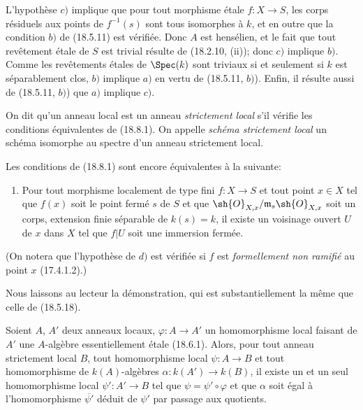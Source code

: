 L'hypothèse $c)$ implique que pour tout morphisme étale $f:X\to S$, les corps résiduels aux points de $f^{-1}(s)$ sont tous isomorphes à $k$, et en outre que la condition $b)$ de (18.5.11) est vérifiée. Donc $A$ est hensélien, et le fait que tout revêtement étale de $S$ est trivial résulte de (18.2.10, (ii)); donc $c)$ implique $b)$. Comme les revêtements étales de $\Spec(k)$ sont triviaux si et seulement si $k$ est séparablement clos, $b)$ implique $a)$ en vertu de (18.5.11, $b)$). Enfin, il résulte aussi de (18.5.11, $b)$) que $a)$ implique $c)$.

\begin{definition}[18.8.2]
\label{IV.18.8.2}
On dit qu'un anneau local est un anneau \emph{strictement local} s'il vérifie les conditions équivalentes de (18.8.1). On appelle \emph{schéma strictement local} un schéma isomorphe au spectre d'un anneau strictement local.
\end{definition}

\begin{remark}[18.8.3]
\label{IV.18.8.3}
Les conditions de (18.8.1) sont encore équivalentes à la suivante:
\begin{enumerate}
  \item[$d)$] Pour tout morphisme localement de type fini $f:X\to S$ et tout point $x\in X$ tel que $f(x)$ soit le point fermé $s$ de $S$ et que $\sh{O}_{X,x}/\mathfrak m_s\sh{O}_{X,x}$ soit un corps, extension finie séparable de $k(s)=k$, il existe un voisinage ouvert $U$ de $x$ dans $X$ tel que $f|U$ soit une immersion fermée.
\end{enumerate}
\end{remark}


(On notera que l'hypothèse de $d)$ est vérifiée si $f$ est \emph{formellement non ramifié} au point $x$ (17.4.1.2).)

Nous laissons au lecteur la démonstration, qui est substantiellement la même que celle de (18.5.18).

\begin{lemma}[18.8.4]
\label{IV.18.8.4}
Soient $A$, $A'$ deux anneaux locaux, $\varphi:A\to A'$ un homomorphisme local faisant de $A'$ une $A$-algèbre essentiellement étale (18.6.1). Alors, pour tout anneau strictement local $B$, tout homomorphisme local $\psi:A\to B$ et tout homomorphisme de $k(A)$-algèbres $\alpha:k(A')\to k(B)$, il existe un et un seul homomorphisme local $\psi':A'\to B$ tel que $\psi=\psi'\circ\varphi$ et que $\alpha$ soit égal à l'homomorphisme $\overline{\psi'}$ déduit de $\psi'$ par passage aux quotients.
\end{lemma}

